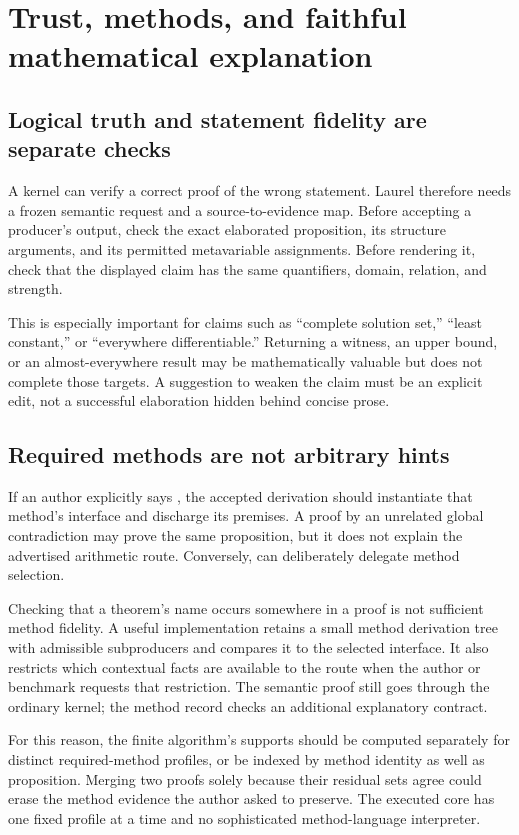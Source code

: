 \documentclass[11pt,a4paper]{article}
\newcommand{\code}[1]{\texttt{\detokenize{#1}}}
\theoremstyle{definition}
\theoremstyle{remark}
\begin{document}
\section{Trust, methods, and faithful mathematical explanation}\label{sec:trust}
\subsection{Logical truth and statement fidelity are separate checks}
A kernel can verify a correct proof of the wrong statement. Laurel therefore needs a frozen semantic request and a source-to-evidence map. Before accepting a producer's output, check the exact elaborated proposition, its structure arguments, and its permitted metavariable assignments. Before rendering it, check that the displayed claim has the same quantifiers, domain, relation, and strength.

This is especially important for claims such as ``complete solution set,'' ``least constant,'' or ``everywhere differentiable.'' Returning a witness, an upper bound, or an almost-everywhere result may be mathematically valuable but does not complete those targets. A suggestion to weaken the claim must be an explicit edit, not a successful elaboration hidden behind concise prose.

\subsection{Required methods are not arbitrary hints}
If an author explicitly says \code{by exact_quotient_transport}, the accepted derivation should instantiate that method's interface and discharge its premises. A proof by an unrelated global contradiction may prove the same proposition, but it does not explain the advertised arithmetic route. Conversely, \code{by?} can deliberately delegate method selection.

Checking that a theorem's name occurs somewhere in a proof is not sufficient method fidelity. A useful implementation retains a small method derivation tree with admissible subproducers and compares it to the selected interface. It also restricts which contextual facts are available to the route when the author or benchmark requests that restriction. The semantic proof still goes through the ordinary kernel; the method record checks an additional explanatory contract.

For this reason, the finite algorithm's supports should be computed separately for distinct required-method profiles, or be indexed by method identity as well as proposition. Merging two proofs solely because their residual sets agree could erase the method evidence the author asked to preserve. The executed core has one fixed profile at a time and no sophisticated method-language interpreter.
\end{document}
